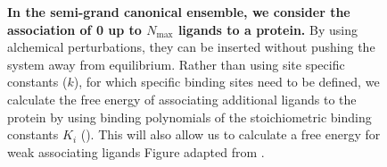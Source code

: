 \documentclass[10pt,final]{article}
\begin{document}
\begin{figure}[H]
  \centering
  \caption{\textbf{In the semi-grand canonical ensemble, we consider the association of 0 up to $N_\mathrm{max}$ ligands to a protein.} By using alchemical perturbations, they can be inserted without pushing the system away from equilibrium. Rather than using site specific constants ($k$), for which specific binding sites need to be defined, we calculate the free energy of associating additional ligands to the protein by using binding polynomials of the stoichiometric binding constants $K_i$ (). This will also allow us to calculate a free energy for weak associating ligands Figure adapted from \textcite{Klotz1997a}. }
  \label{figure:semi-grand}
\end{figure}
\end{document}
